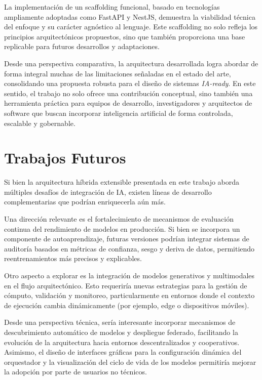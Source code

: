\documentclass[a4paper]{llncs}
\begin{document}
La implementación de un scaffolding funcional, basado en tecnologías ampliamente adoptadas como FastAPI y NestJS, demuestra la viabilidad técnica del enfoque y su carácter agnóstico al lenguaje. Este scaffolding no solo refleja los principios arquitectónicos propuestos, sino que también proporciona una base replicable para futuros desarrollos y adaptaciones.

Desde una perspectiva comparativa, la arquitectura desarrollada logra abordar de forma integral muchas de las limitaciones señaladas en el estado del arte, consolidando una propuesta robusta para el diseño de sistemas \textit{IA-ready}. En este sentido, el trabajo no solo ofrece una contribución conceptual, sino también una herramienta práctica para equipos de desarrollo, investigadores y arquitectos de software que buscan incorporar inteligencia artificial de forma controlada, escalable y gobernable.




\section{Trabajos Futuros}

Si bien la arquitectura híbrida extensible presentada en este trabajo aborda múltiples desafíos de integración de IA, existen líneas de desarrollo complementarias que podrían enriquecerla aún más.

Una dirección relevante es el fortalecimiento de mecanismos de evaluación continua del rendimiento de modelos en producción. Si bien se incorpora un componente de autoaprendizaje, futuras versiones podrían integrar sistemas de auditoría basados en métricas de confianza, sesgo y deriva de datos, permitiendo reentrenamientos más precisos y explicables.

Otro aspecto a explorar es la integración de modelos generativos y multimodales en el flujo arquitectónico. Esto requeriría nuevas estrategias para la gestión de cómputo, validación y monitoreo, particularmente en entornos donde el contexto de ejecución cambia dinámicamente (por ejemplo, edge o dispositivos móviles).

Desde una perspectiva técnica, sería interesante incorporar mecanismos de descubrimiento automático de modelos y despliegue federado, facilitando la evolución de la arquitectura hacia entornos descentralizados y cooperativos. Asimismo, el diseño de interfaces gráficas para la configuración dinámica del orquestador y la visualización del ciclo de vida de los modelos permitiría mejorar la adopción por parte de usuarios no técnicos.
\end{document}
